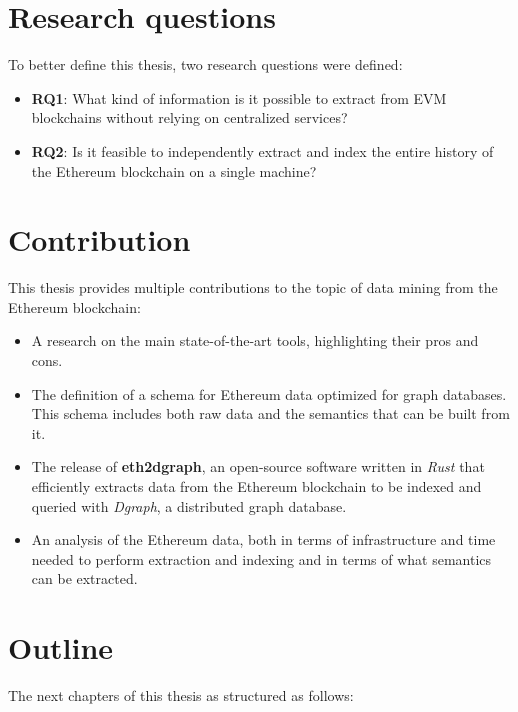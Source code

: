 \section{Research questions}

To better define this thesis, two research questions were defined:

\begin{itemize}
    \item \textbf{RQ1}: What kind of information is it possible to extract from EVM blockchains without relying on centralized services?
    \item \textbf{RQ2}: Is it feasible to independently extract and index the entire history of the Ethereum blockchain on a single machine?
\end{itemize} 

\section{Contribution}

This thesis provides multiple contributions to the topic of data mining from the Ethereum blockchain:

\begin{itemize}
    \item A research on the main state-of-the-art tools, highlighting their pros and cons.
    \item The definition of a schema for Ethereum data optimized for graph databases. This schema includes both raw data and the semantics that can be built from it.
    \item The release of \textbf{eth2dgraph}, an open-source software written in \textit{Rust} that efficiently extracts data from the Ethereum blockchain to be indexed and queried with \textit{Dgraph}, a distributed graph database. 
    \item An analysis of the Ethereum data, both in terms of infrastructure and time needed to perform extraction and indexing and in terms of what semantics can be extracted.
\end{itemize}

\section{Outline}

The next chapters of this thesis as structured as follows:

